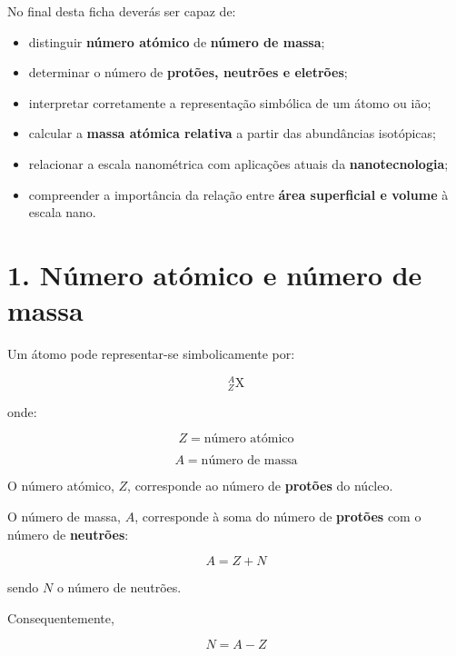 \documentclass[11pt,a4paper]{article}
\begin{document}
	\begin{tcolorbox}[
		colback=eugray,
		colframe=eudark,
		title=\textbf{Objetivos de aprendizagem}
		]
		No final desta ficha deverás ser capaz de:
		
		\begin{itemize}[leftmargin=6mm,itemsep=1mm]
			\item distinguir \textbf{número atómico} de \textbf{número de massa};
			\item determinar o número de \textbf{protões, neutrões e eletrões};
			\item interpretar corretamente a representação simbólica de um átomo ou ião;
			\item calcular a \textbf{massa atómica relativa} a partir das abundâncias isotópicas;
			\item relacionar a escala nanométrica com aplicações atuais da \textbf{nanotecnologia};
			\item compreender a importância da relação entre \textbf{área superficial e volume} à escala nano.
		\end{itemize}
	\end{tcolorbox}
	
	
	\section*{\textcolor{eublue}{1. Número atómico e número de massa}}
	
	\begin{recorda}
		
		Um átomo pode representar-se simbolicamente por:
		
		\[
		{}^{A}_{Z}\mathrm{X}
		\]
		
		onde:
		
		\[
		\boxed{Z = \text{número atómico}}
		\]
		
		\[
		\boxed{A = \text{número de massa}}
		\]
		
		O número atómico, \(Z\), corresponde ao número de \textbf{protões} do núcleo.
		
		O número de massa, \(A\), corresponde à soma do número de \textbf{protões} com o número de \textbf{neutrões}:
		
		\[
		\boxed{A=Z+N}
		\]
		
		sendo \(N\) o número de neutrões.
		
		Consequentemente,
		
		\[
		\boxed{N=A-Z}
		\]
		
	\end{recorda}
	
\end{document}
